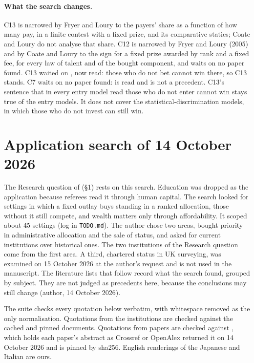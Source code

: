 \documentclass[11pt,a4paper]{article}
\begin{document}
\paragraph{What the search changes.} C13 is narrowed by Fryer and Loury to the
payers' share as a function of how many pay, in a finite contest with a fixed
prize, and its comparative statics; Coate and Loury do not analyse that share.
C12 is narrowed by Fryer and Loury (2005) and by Coate and Loury to the sign for
a fixed prize awarded by rank and a fixed fee, for every law of talent and of
the bought component, and waits on no paper found. C13 waited on
\citet{CorcoranKarels1985}, now read: those who do not bet cannot win there, so
C13 stands. C7 waits on no paper found:
\citet{FuLu2009} is read and is not a precedent. C13's sentence that in every entry model read those who do
not enter cannot win stays true of the entry models. It does not cover the
statistical-discrimination models, in which those who do not invest can still
win.

\section{Application search of 14 October 2026}
\label{sec:application-search}

The Research question of  (\S1) rests on this search.
Education was dropped as the application because referees read it through
human capital. The search looked for settings in which a fixed outlay buys
standing in a ranked allocation, those without it still compete, and wealth
matters only through affordability. It scoped about 45 settings (log in
\texttt{TODO.md}). The author chose two areas, bought priority in
administrative allocation and the sale of status, and asked for current institutions over historical ones. The two institutions of
the Research question come from the first area. A third, chartered status in
UK surveying, was examined on 15 October 2026 at the author's request and is
not used in the manuscript. The literature lists that follow record what the search found,
grouped by subject. They are not judged as precedents here, because the
conclusions may still change (author, 14 October 2026).

The suite  checks every
quotation below verbatim, with whitespace removed as the only normalisation. Quotations from the institutions are checked
against the cached and pinned documents. Quotations from papers are checked
against , which holds each
paper's abstract as Crossref or OpenAlex returned it on 14 October 2026 and is
pinned by sha256. English renderings of the Japanese and Italian are ours.
\end{document}
